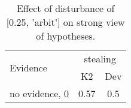 \begin{table}\begin{tabular}{l|cc}\toprule\multirow{2}{*}{Evidence} & \multicolumn{2}{c}{stealing}\\& {K2} & {Dev}\\\midrule
no evidence, 0 & \cellcolor{Bittersweet}0.57&\cellcolor{Bittersweet}0.5\\\bottomrule\end{tabular}\caption{Effect of disturbance of [0.25, 'arbit'] on strong view of hypotheses.}\end{table}